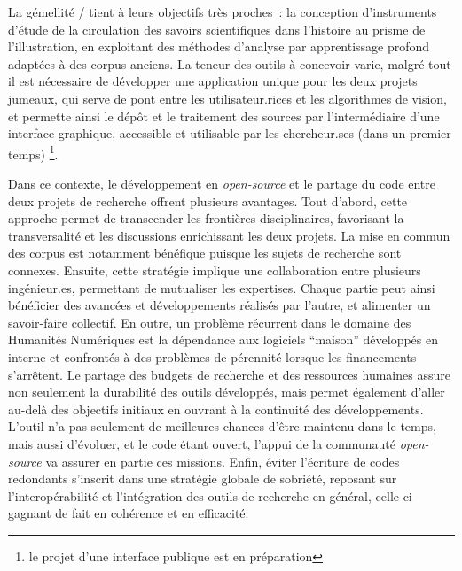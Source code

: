 La gémellité \eida / \vhs tient à leurs objectifs très proches~: la
conception d'instruments d'étude de la circulation des savoirs
scientifiques dans l'histoire au prisme de l'illustration, en exploitant
des méthodes d'analyse par apprentissage profond adaptées à des corpus
anciens. La teneur des outils à concevoir varie, malgré tout il est
nécessaire de développer une application unique pour les deux projets
jumeaux, qui serve de pont entre les utilisateur.rices et les algorithmes de
vision, et permette ainsi le dépôt et le traitement des sources par
l'intermédiaire d'une interface graphique, accessible et utilisable par
les chercheur.ses (dans un premier temps) \footnote{le projet d'une
  interface publique est en préparation}.

Dans ce contexte, le développement en \textit{open-source} et le partage du code
entre deux projets de recherche offrent plusieurs avantages. Tout
d'abord, cette approche permet de transcender les frontières
disciplinaires, favorisant la transversalité et les discussions
enrichissant les deux projets. La mise en commun des corpus est
notamment bénéfique puisque les sujets de recherche sont connexes.
Ensuite, cette stratégie implique une collaboration entre plusieurs
ingénieur.es, permettant de mutualiser les expertises. Chaque partie peut
ainsi bénéficier des avancées et développements réalisés par l'autre, et
alimenter un savoir-faire collectif. En outre, un problème récurrent
dans le domaine des Humanités Numériques est la dépendance aux logiciels
``maison'' développés en interne et confrontés à des problèmes de
pérennité lorsque les financements s'arrêtent. Le partage des budgets de
recherche et des ressources humaines assure non seulement la durabilité
des outils développés, mais permet également d'aller au-delà des
objectifs initiaux en ouvrant à la continuité des développements.
L'outil n'a pas seulement de meilleures chances d'être maintenu dans le
temps, mais aussi d'évoluer, et le code étant ouvert, l'appui de la
communauté \textit{open-source} va assurer en partie ces missions. Enfin, éviter
l'écriture de codes redondants s'inscrit dans une stratégie globale de
sobriété, reposant sur l'interopérabilité et l'intégration des outils de
recherche en général, celle-ci gagnant de fait en cohérence et en
efficacité.

